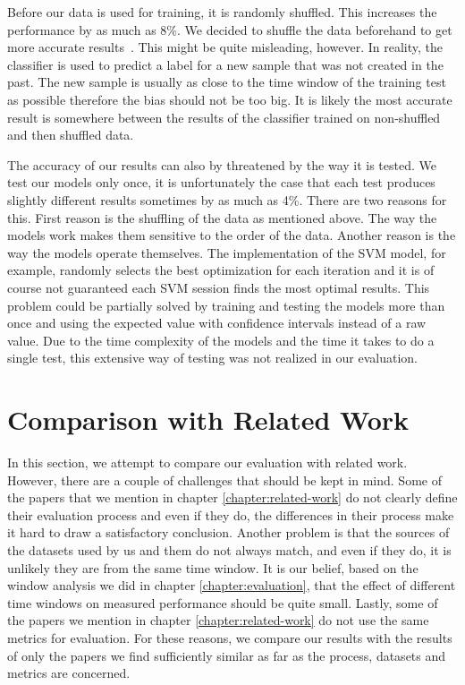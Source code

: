 Before our data is used for training, it is randomly shuffled. This increases the performance by as much as 8\%. We decided to shuffle the data beforehand to get more accurate results~. This might be quite misleading, however. In reality, the classifier is used to predict a label for a new sample that was not created in the past. The new sample is usually as close to the time window of the training test as possible therefore the bias should not be too big. It is likely the most accurate result is somewhere between the results of the classifier trained on non-shuffled and then shuffled data.

The accuracy of our results can also by threatened by the way it is tested. We test our models only once, it is unfortunately the case that each test produces slightly different results sometimes by as much as 4\%. There are two reasons for this. First reason is the shuffling of the data as mentioned above. The way the models work makes them sensitive to the order of the data. Another reason is the way the models operate themselves. The implementation of the SVM model, for example, randomly selects the best optimization for each iteration and it is of course not guaranteed each SVM session finds the most optimal results. This problem could be partially solved by training and testing the models more than once and using the expected value with confidence intervals instead of a raw value. Due to the time complexity of the models and the time it takes to do a single test, this extensive way of testing was not realized in our evaluation.

\section{Comparison with Related Work}

In this section, we attempt to compare our evaluation with related work. However, there are a couple of challenges that should be kept in mind. Some of the papers that we mention in chapter \ref{chapter:related-work} do not clearly define their evaluation process and even if they do, the differences in their process make it hard to draw a satisfactory conclusion. Another problem is that the sources of the datasets used by us and them do not always match, and even if they do, it is unlikely they are from the same time window. It is our belief, based on the window analysis we did in chapter \ref{chapter:evaluation}, that the effect of different time windows on measured performance should be quite small. Lastly, some of the papers we mention in chapter \ref{chapter:related-work} do not use the same metrics for evaluation. For these reasons, we compare our results with the results of only the papers we find sufficiently similar as far as the process, datasets and metrics are concerned.


